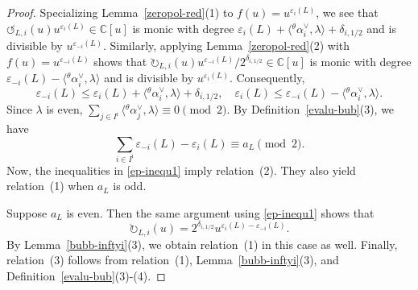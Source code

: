 \documentclass[a4,10pt]{amsart}
\numberwithin{equation}{section}
\theoremstyle{definition}
\begin{document}
\begin{proof} 
Specializing  Lemma~\ref{zeropol-red}(1) to  $f(u)=u^{\varepsilon_i(L)}$, we see  that $\circlearrowleft_{L,i}(u)u^{\varepsilon_i(L)}\in \mathbb C[u]$ is monic with degree $\varepsilon_i(L)+\langle {}^\theta\alpha_i^\vee,\lambda\rangle+\delta_{i,1/2}$ and is divisible by $u^{\varepsilon_{-i}(L)}$. Similarly,   applying  Lemma~\ref{zeropol-red}(2) with   $f(u)=u^{\varepsilon_{-i}(L)}$ shows that  $\circlearrowright_{L,i}(u)u^{\varepsilon_{-i}(L)}/2^{\delta_{i,1/2}}\in \mathbb C[u]$ is  monic with degree $\varepsilon_{-i}(L)-\langle {}^\theta\alpha_i^\vee,\lambda\rangle$ and  is divisible by $u^{\varepsilon_i(L)}$. 
Consequently,
\begin{equation}\label{ep-inequ1}
\varepsilon_{-i}(L) \le \varepsilon_i(L)+\langle {}^\theta\alpha_i^\vee,\lambda\rangle+\delta_{i,1/2}, \quad 
\varepsilon_i(L) \le \varepsilon_{-i}(L)-\langle {}^\theta\alpha_i^\vee,\lambda\rangle.
\end{equation}
{Since  $\lambda$ is even,  $\sum_{j\in I^\imath}\langle{}^\theta\alpha_j^\vee,\lambda\rangle\equiv 0 \pmod 2$. By Definition~\ref{evalu-bub}(3), we have      $$\sum_{i\in I^\imath} \varepsilon_{-i}(L)-\varepsilon_i(L) \equiv a_L \pmod 2.$$   
Now,  the inequalities in  \eqref{ep-inequ1} imply relation~(2). } They  also yield 
relation~(1) when $a_L$ is odd. 

 Suppose $a_L$ is even. Then the same  argument using \eqref{ep-inequ1} shows that 
\[
\circlearrowright_{L,i}(u)
=
2^{\delta_{i,1/2}}
u^{\varepsilon_i(L)-\varepsilon_{-i}(L)}
.\]  By Lemma~\ref{bubb-inftyi}(3), we
 obtain relation~(1) in this case  as well. 
Finally, relation~(3) follows from relation~(1), Lemma~\ref{bubb-inftyi}(3),
and Definition~\ref{evalu-bub}(3)-(4).  
\end{proof}
\end{document}
